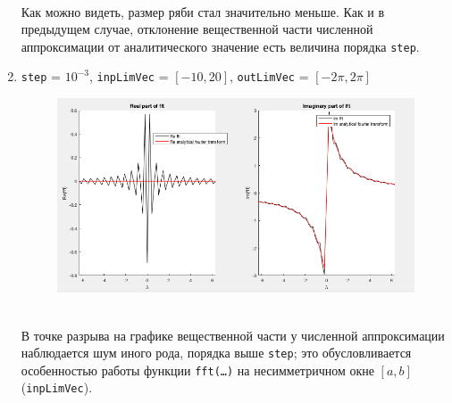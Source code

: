 \documentclass[11pt, oneside, draft]{article}
\numberwithin{equation}{section}
\begin{document}
\begin{enumerate}
\begin{figure}[!h]
            \label{pic:f2:2}
        \end{figure} \\
        Как можно видеть, размер ряби стал значительно меньше. Как и в предыдущем случае, отклонение вещественной части численной аппроксимации от аналитического значение
        есть величина порядка \texttt{step}.
        \clearpage
        \item
        \label{it:fftnoise}
        \texttt{step} = \(10^{-3}\), \texttt{inpLimVec} = \( [-10, 20] \), \texttt{outLimVec} = \( [-2\pi, 2\pi] \)
        \begin{figure}[!h]
            \centering
            \includegraphics[width=\linewidth]{f2fig3}
            \label{pic:f2:3}
        \end{figure} \\
        В точке разрыва на графике вещественной части у численной аппроксимации наблюдается шум иного рода, порядка выше \texttt{step}; 
        это обусловливается особенностью работы функции \texttt{fft(\dots)} на несимметричном окне \([a, b]\) (\texttt{inpLimVec}).
    \end{enumerate}
    \clearpage
\end{document}
